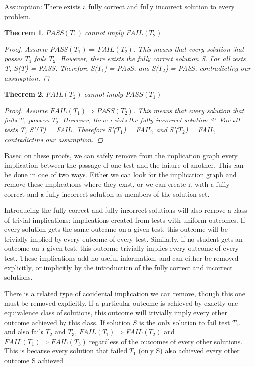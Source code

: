 \documentclass[11pt,twoside]{article}
\newcommand\fail{\mathit{FAIL}}
\newcommand\pass{\mathit{PASS}}
\newtheorem{thm}{Theorem}
\theoremstyle{definition}
\begin{document}
Assumption: There exists a fully correct and fully incorrect solution to every problem.


\begin{thm} $\pass(T_1)$ cannot imply $\fail(T_2)$

\begin{proof} Assume $\pass(T_1) \Rightarrow \fail(T_2)$. This means that every solution that passes $T_1$ fails $T_2$. However, there exists the fully correct solution S. For all tests T, S(T) = PASS. Therefore S($T_1$) = PASS, and S($T_2$) = PASS, contradicting our assumption.
\end{proof}
\end{thm}

\begin{thm} $\fail(T_2)$ cannot imply $\pass(T_1)$

\begin{proof} Assume $\fail(T_1) \Rightarrow \pass(T_2)$. This means that every solution that fails $T_1$ passess $T_2$. However, there exists the fully incorrect solution S'. For all tests T, S'(T) = FAIL. Therefore S'($T_1$) = FAIL, and S'($T_2$) = FAIL, contradicting our assumption.
\end{proof}
\end{thm}



Based on these proofs, we can safely remove from the implication graph every implication between the passage of one test and the failure of another. This can be done in one of two ways. Either we can look for the implication graph and remove these implications where they exist, or we can create it with a fully correct and a fully incorrect solution as members of the solution set.

Introducing the fully correct and fully incorrect solutions will also remove a class of trivial implications: implications created from tests with uniform outcomes. If every solution gets the same outcome on a given test, this outcome will be trivially implied by every outcome of every test. Similarly, if no student gets an outcome on a given test, this outcome trivially implies every outcome of every test. These implications add no useful information, and can either be removed explicitly, or implicitly by the introduction of the fully correct and incorrect solutions.

There is a related type of accidental implication we can remove, though this one must be removed explicitly. If a particular outcome is achieved by exactly one equivalence class of solutions, this outcome will trivially imply every other outcome achieved by this class. If solution $S$ is the only solution to fail test $T_1$, and also fails $T_2$ and $T_3$, $\fail(T_1) \Rightarrow \fail(T_2)$ and $\fail(T_1) \Rightarrow \fail(T_3)$ regardless of the outcomes of every other solutions. This is because every solution that failed $T_1$ (only S) also achieved every other outcome S achieved. 
\end{document}
